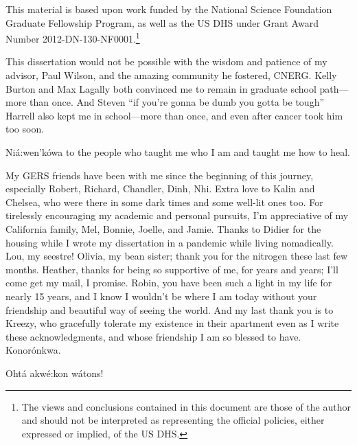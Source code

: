 This material is based upon work funded by the National Science Foundation Graduate
Fellowship Program, as well as the \gls{US} \gls{DHS} under Grant Award Number
2012-DN-130-NF0001.\footnote{The views and conclusions contained in this
document are those of the author and should not be interpreted as representing
the official policies, either expressed or implied, of the \gls{US} \gls{DHS}.} 

This dissertation would not be possible with the wisdom and patience of my
advisor, Paul Wilson, and the amazing community he fostered, CNERG. Kelly
Burton and Max Lagally both convinced me to remain in graduate school
path---more than once. And Steven ``if you're gonna be dumb you gotta be
tough'' Harrell also kept me in school---more than once, and even after cancer
took him too soon.  

Ni\'{a}:wen'k\'{o}wa to the people who taught me who I am and taught me how to
heal. 

My GERS friends have been with me since the beginning of this journey,
especially Robert, Richard, Chandler, Dinh, Nhi. Extra love to Kalin and
Chelsea, who were there in some dark times and some well-lit ones too.  For
tirelessly encouraging my academic and personal pursuits, I'm appreciative of
my California family, Mel, Bonnie, Joelle, and Jamie.  Thanks to Didier for the
housing while I wrote my dissertation in a pandemic while living nomadically.
Lou, my seestre!  Olivia, my bean sister; thank you for the nitrogen these last
few months.  Heather, thanks for being so supportive of me, for years and
years; I'll come get my mail, I promise.  Robin, you have been such a light in
my life for nearly 15 years, and I know I wouldn't be where I am today without
your friendship and beautiful way of seeing the world. And my last thank you is
to Kreezy, who gracefully tolerate my existence in their apartment even as I
write these acknowledgments, and whose friendship I am so blessed to have.
Konor\'{o}nkwa.

Oht\'{a} akw\'{e}:kon w\'{a}tons!
